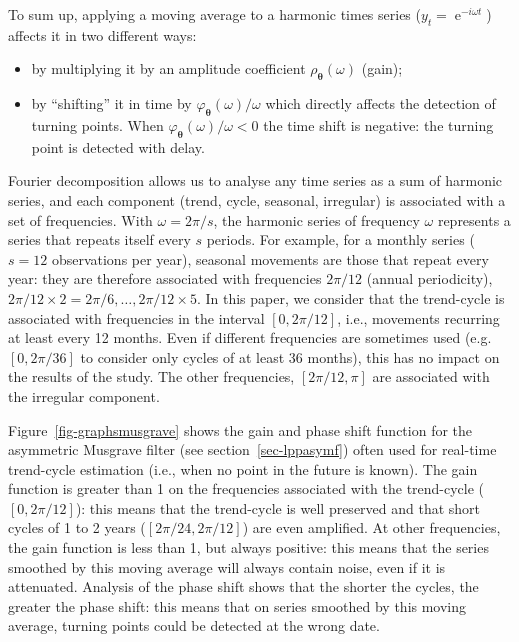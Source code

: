 \documentclass[
]{article}
\DeclareMathOperator{\e}{e}
\newcommand\1{\mathds{1}}
\begin{document}
To sum up, applying a moving average to a harmonic times series
(\(y_t=\e^{-i\omega t}\)) affects it in two different ways:

\begin{itemize}
\item
  by multiplying it by an amplitude coefficient
  \(\rho_{\boldsymbol\theta}\left(\omega\right)\) (gain);
\item
  by ``shifting'' it in time by
  \(\varphi_{\boldsymbol\theta}(\omega)/\omega\) which directly affects
  the detection of turning points. When
  \(\varphi_{\boldsymbol\theta}(\omega)/\omega<0\) the time shift is
  negative: the turning point is detected with delay.
\end{itemize}

Fourier decomposition allows us to analyse any time series as a sum of
harmonic series, and each component (trend, cycle, seasonal, irregular)
is associated with a set of frequencies. With \(\omega = 2\pi/s\), the
harmonic series of frequency \(\omega\) represents a series that repeats
itself every \(s\) periods. For example, for a monthly series (\(s=12\)
observations per year), seasonal movements are those that repeat every
year: they are therefore associated with frequencies \(2\pi/12\) (annual
periodicity), \(2\pi/12\times 2=2\pi/6,\dots,2\pi/12\times 5\). In this
paper, we consider that the trend-cycle is associated with frequencies
in the interval \([0, 2\pi/12]\), i.e., movements recurring at least
every 12 months. Even if different frequencies are sometimes used
(e.g.~\([0, 2\pi/36]\) to consider only cycles of at least 36 months),
this has no impact on the results of the study. The other frequencies,
\([2\pi/12, \pi]\) are associated with the irregular component.

Figure~\ref{fig-graphsmusgrave} shows the gain and phase shift function
for the asymmetric Musgrave filter (see section~\ref{sec-lppasymf})
often used for real-time trend-cycle estimation (i.e., when no point in
the future is known). The gain function is greater than 1 on the
frequencies associated with the trend-cycle (\([0, 2\pi/12]\)): this
means that the trend-cycle is well preserved and that short cycles of 1
to 2 years (\([2\pi/24,2\pi/12]\)) are even amplified. At other
frequencies, the gain function is less than 1, but always positive: this
means that the series smoothed by this moving average will always
contain noise, even if it is attenuated. Analysis of the phase shift
shows that the shorter the cycles, the greater the phase shift: this
means that on series smoothed by this moving average, turning points
could be detected at the wrong date.
\end{document}
